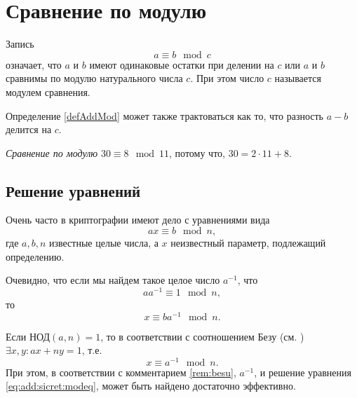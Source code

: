 \section{Сравнение по модулю}
\begin{definition}
Запись 
\begin{equation}
a \equiv b \mod{c}
\label{defAddMod}
\end{equation}
означает, что $a$ и $b$ имеют одинаковые остатки при делении на $c$
или $a$ и $b$ сравнимы по модулю натурального числа $c$. При этом
число $c$ называется модулем сравнения.
\end{definition}

Определение \ref{defAddMod} может также трактоваться как то, что
разность $a - b$ делится на $c$.

\begin{example}
\emph{Сравнение по модулю}
$30 \equiv 8 \mod{11}$, потому что, $30 = 2 \cdot 11 + 8$.
\end{example}

\subsection{Решение уравнений}

Очень часто в криптографии имеют дело с уравнениями вида
\begin{equation}
a x \equiv b \mod n,
\label{eq:add:sicret:modeq}
\end{equation}
где $a, b, n$ известные целые числа, а $x$ неизвестный параметр,
подлежащий определению.

Очевидно, что если мы найдем такое целое число $a^{-1}$, что 
\[
a a^{-1} \equiv 1 \mod n,
\]
то
\[
x \equiv b a^{-1} \mod n.
\]

Если $\mbox{НОД}\left(a, n\right) = 1$, то в соответствии с
соотношением Безу (см. ) 
$\exists x, y: a x + n y = 1$, т.е. 
\[
x \equiv a^{-1} \mod n.
\]
При этом, в соответствии с комментарием \ref{rem:besu}, $a^{-1}$, и
решение уравнения \eqref{eq:add:sicret:modeq}, может быть найдено
достаточно эффективно.

